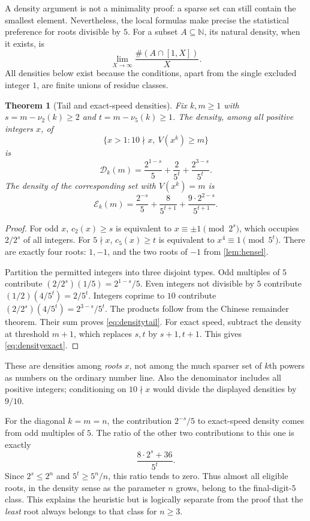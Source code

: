 \documentclass[11pt,a4paper]{article}
\newtheorem{theorem}{Theorem}[section]
\theoremstyle{definition}
\newcommand{\N}{\mathbb N}
\begin{document}
A density argument is not a minimality proof: a sparse set can still
contain the smallest element. Nevertheless, the local formulas make
precise the statistical preference for roots divisible by $5$.
For a subset $A\subseteq\N$, its natural density, when it exists, is
\[
\lim_{X\to\infty}\frac{\#(A\cap[1,X])}{X}.
\]
All densities below exist because the conditions, apart from the single
excluded integer $1$, are finite unions of residue classes.

\begin{theorem}[Tail and exact-speed densities]
\label{thm:density}
Fix $k,m\ge1$ with $s=m-\nu_2(k)\ge2$ and $t=m-\nu_5(k)\ge1$.
The density, among all positive integers $x$, of
\[
\{x>1:10\nmid x,\ V(x^k)\ge m\}
\]
is
\begin{equation}
\mathcal D_k(m)=\frac{2^{1-s}}5+\frac2{5^t}
+\frac{2^{3-s}}{5^t}.
\label{eq:densitytail}
\end{equation}
The density of the corresponding set with $V(x^k)=m$ is
\begin{equation}
\mathcal E_k(m)=\frac{2^{-s}}5+\frac8{5^{t+1}}
+\frac{9\cdot2^{2-s}}{5^{t+1}}.
\label{eq:densityexact}
\end{equation}
\end{theorem}
\begin{proof}
For odd $x$, $c_2(x)\ge s$ is equivalent to
$x\equiv\pm1\pmod{2^s}$, which occupies $2/2^s$ of all integers.
For $5\nmid x$, $c_5(x)\ge t$ is equivalent to $x^4\equiv1\pmod{5^t}$.
There are exactly four roots: $1,-1$, and the two roots of $-1$ from
\cref{lem:hensel}.

Partition the permitted integers into three disjoint types. Odd
multiples of $5$ contribute
$(2/2^s)(1/5)=2^{1-s}/5$. Even integers not divisible by $5$ contribute
$(1/2)(4/5^t)=2/5^t$. Integers coprime to $10$ contribute
$(2/2^s)(4/5^t)=2^{3-s}/5^t$. The products follow from the Chinese
remainder theorem. Their sum proves \eqref{eq:densitytail}.
For exact speed, subtract the density at threshold $m+1$, which replaces
$s,t$ by $s+1,t+1$. This gives \eqref{eq:densityexact}.
\end{proof}

These are densities among \emph{roots} $x$, not among the much sparser
set of $k$th powers as numbers on the ordinary number line. Also the
denominator includes all positive integers; conditioning on $10\nmid x$
would divide the displayed densities by $9/10$.

For the diagonal $k=m=n$, the contribution $2^{-s}/5$ to exact-speed
density comes from odd multiples of $5$. The ratio of the other two
contributions to this one is exactly
\[
\frac{8\cdot2^s+36}{5^t}.
\]
Since $2^s\le2^n$ and $5^t\ge5^n/n$, this ratio tends to zero.
Thus almost all eligible roots, in the density sense as the parameter
$n$ grows, belong to the final-digit-$5$ class. This explains the
heuristic but is logically separate from the proof that the
\emph{least} root always belongs to that class for $n\ge3$.
\end{document}
